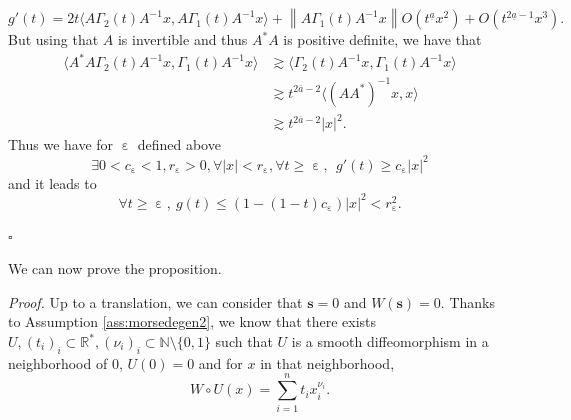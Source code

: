 \documentclass[12pt]{amsart}
\newcommand{\N}{\mathbb N}
\newcommand{\R}{\mathbb R}
\def\<{\langle}
\def\>{\rangle}
\newcommand{\bp}{{\it Proof. }}
\newcommand{\ep}{\hfill $\square$}
\numberwithin{equation}{section}
\numberwithin{figure}{section}
\def\s{\mathbf{s}}
\DeclareMathOperator{\eps}{\varepsilon}
\newcommand{\vvert}[1]{\left\lVert#1\right\rVert}
\begin{document}
\begin{equation*}
g'(t) = 2t\<A\Gamma_2(t)A^{-1}x,A\Gamma_1(t)A^{-1}x\> + \vvert{A\Gamma_1(t)A^{-1}x}O(t^{\underline a}x^2) + O(t^{2\underline a-1}x^3).
\end{equation*}
But using that $A$ is invertible and thus $A^*A$ is positive definite, we have that
\begin{equation*}
\begin{aligned}
    \<A^*A\Gamma_2(t)A^{-1}x,\Gamma_1(t)A^{-1}x\> &\gtrsim \<\Gamma_2(t)A^{-1}x,\Gamma_1(t)A^{-1}x\>\\
    &\gtrsim t^{2\overline a-2}\<(AA^*)^{-1}x,x\>\\
    &\gtrsim t^{2\overline a-2}|x|^2.
\end{aligned}
\end{equation*}
Thus we have for $\eps$ defined above
\begin{equation*}
\exists 0<c_{\eps}<1,r_{\eps}>0,\forall |x|<r_{\eps},\forall t\geq\eps,\ \ g'(t) \geq c_{\eps}|x|^2
\end{equation*}
and it leads to
\begin{equation*}
\forall t\geq\eps,\ g(t) \leq (1-(1-t)c_{\eps})|x|^2 < r_{\eps}^2.
\end{equation*}

\ep

We can now prove the proposition.

\bp
Up to a translation, we can consider that $\s=0$ and $W(\s)=0$. Thanks to Assumption \ref{ass:morsedegen2}, we know that there exists $U, (t_i)_i\subset\R^*, (\nu_i)_i\subset\N\setminus\{0,1\}$ such that $U$ is a smooth diffeomorphism in a neighborhood of $0$, $U(0) = 0$ and for $x$ in that neighborhood,
\begin{equation*}
W\circ U (x) = \sum_{i=1}^nt_ix_i^{\nu_i}.
\end{equation*}
\end{document}
